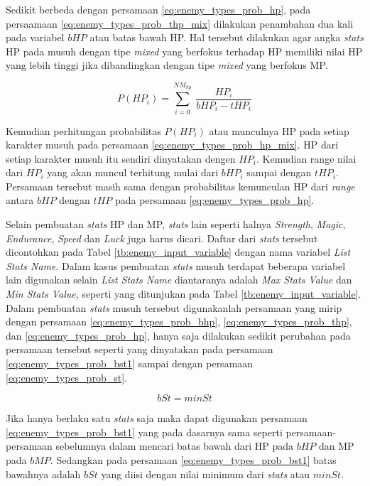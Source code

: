 Sedikit berbeda dengan persamaan \ref{eq:enemy_types_prob_hp}, pada persaamaan \ref{eq:enemy_types_prob_thp_mix} dilakukan penambahan dua kali pada variabel $bHP$ atau batas bawah HP. Hal tersebut dilakukan agar angka \textit{stats} HP pada musuh dengan tipe \textit{mixed} yang berfokus terhadap HP memiliki nilai HP yang lebih tinggi jika dibandingkan dengan tipe \textit{mixed} yang berfokus MP.
\vspace{1ex}

\begin{equation}\label{eq:enemy_types_prob_hp_mix}
P(HP_{i}) = \sum_{i=0}^{NM_{hp}}\ \frac{HP_{i}}{bHP_{i} - tHP_{i}}
\end{equation}

Kemudian perhitungan probabilitas $P(HP_{i})$ atau munculnya HP pada setiap karakter musuh pada persamaan \ref{eq:enemy_types_prob_hp_mix}. HP dari setiap karakter musuh itu sendiri dinyatakan dengen $HP_{i}$. Kemudian range nilai dari $HP_{i}$ yang akan muncul terhitung mulai dari $bHP_{i}$ sampai dengan $tHP_{i}$. Persamaan tersebut masih sama dengan probabilitas kemunculan HP dari \textit{range} antara $bHP$ dengan $tHP$ pada persamaan \ref{eq:enemy_types_prob_hp}.
\vspace{1ex}

Selain pembuatan \textit{stats} HP dan MP, \textit{stats} lain seperti halnya \textit{Strength}, \textit{Magic}, \textit{Endurance}, \textit{Speed} dan \textit{Luck} juga harus dicari. Daftar dari \textit{stats} tersebut dicontohkan pada Tabel \ref{tb:enemy_input_variable} dengan nama variabel \textit{List Stats Name}. Dalam kasus pembuatan \textit{stats} musuh terdapat beberapa variabel lain digunakan selain \textit{List Stats Name} diantaranya adalah \textit{Max Stats Value} dan \textit{Min Stats Value}, seperti yang ditunjukan pada Tabel \ref{tb:enemy_input_variable}. Dalam pembuatan \textit{stats} musuh tersebut digunakanlah persamaan yang mirip dengan persamaan \ref{eq:enemy_types_prob_bhp}, \ref{eq:enemy_types_prob_thp}, dan \ref{eq:enemy_types_prob_hp}, hanya saja dilakukan sedikit perubahan pada persamaan tersebut seperti yang dinyatakan pada persamaan \ref{eq:enemy_types_prob_bst1} sampai dengan persamaan \ref{eq:enemy_types_prob_st}.
\vspace{-1ex}

\begin{equation}\label{eq:enemy_types_prob_bst1}
bSt = minSt
\end{equation}

Jika hanya berlaku satu \textit{stats} saja maka dapat digunakan persamaan \ref{eq:enemy_types_prob_bst1} yang pada dasarnya sama seperti persamaan-persamaan sebelumnya dalam mencari batas bawah dari HP pada $bHP$ dan MP pada $bMP$. Sedangkan pada persamaan \ref{eq:enemy_types_prob_bst1} batas bawahnya adalah $bSt$ yang diisi dengan nilai minimum dari \textit{stats} atau $minSt$.
\vspace{1ex}

